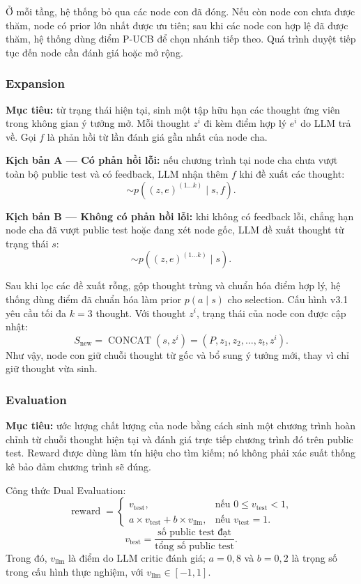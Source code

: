Ở mỗi tầng, hệ thống bỏ qua các node con đã đóng. Nếu còn node con chưa được thăm, node có prior lớn nhất được ưu tiên; sau khi các node con hợp lệ đã được thăm, hệ thống dùng điểm P-UCB để chọn nhánh tiếp theo. Quá trình duyệt tiếp tục đến node cần đánh giá hoặc mở rộng.

\subsubsection{Expansion}
\textbf{Mục tiêu:} từ trạng thái hiện tại, sinh một tập hữu hạn các thought ứng viên trong không gian ý tưởng mở. Mỗi thought $z^i$ đi kèm điểm hợp lý $e^i$ do LLM trả về. Gọi $f$ là phản hồi từ lần đánh giá gần nhất của node cha.

\textbf{Kịch bản A — Có phản hồi lỗi:} nếu chương trình tại node cha chưa vượt toàn bộ public test và có feedback, LLM nhận thêm $f$ khi đề xuất các thought:
\begin{equation}
  [(z^1,e^1),\ldots,(z^k,e^k)]
  \sim p\!\left((z,e)^{(1\ldots k)}\mid s,f\right).
  \tag{A}
\end{equation}

\textbf{Kịch bản B — Không có phản hồi lỗi:} khi không có feedback lỗi, chẳng hạn node cha đã vượt public test hoặc đang xét node gốc, LLM đề xuất thought từ trạng thái $s$:
\begin{equation}
  [(z^1,e^1),\ldots,(z^k,e^k)]
  \sim p\!\left((z,e)^{(1\ldots k)}\mid s\right).
  \tag{B}
\end{equation}

Sau khi lọc các đề xuất rỗng, gộp thought trùng và chuẩn hóa điểm hợp lý, hệ thống dùng điểm đã chuẩn hóa làm prior $p(a\mid s)$ cho selection. Cấu hình v3.1 yêu cầu tối đa $k=3$ thought. Với thought $z^i$, trạng thái của node con được cập nhật:
\[
  S_{\mathrm{new}}
  = \operatorname{CONCAT}(s,z^i)
  = (P,z_1,z_2,\ldots,z_t,z^i).
\]
Như vậy, node con giữ chuỗi thought từ gốc và bổ sung ý tưởng mới, thay vì chỉ giữ thought vừa sinh.

\subsubsection{Evaluation}
\textbf{Mục tiêu:} ước lượng chất lượng của node bằng cách sinh một chương trình hoàn chỉnh từ chuỗi thought hiện tại và đánh giá trực tiếp chương trình đó trên public test. Reward được dùng làm tín hiệu cho tìm kiếm; nó không phải xác suất thống kê bảo đảm chương trình sẽ đúng.

Công thức Dual Evaluation:
\[
  \operatorname{reward}=
  \begin{cases}
    v_{\mathrm{test}}, & \text{nếu } 0\le v_{\mathrm{test}}<1,\\
    a\times v_{\mathrm{test}}+b\times v_{\mathrm{llm}},
      & \text{nếu } v_{\mathrm{test}}=1.
  \end{cases}
\]
\[
  v_{\mathrm{test}}
  =\frac{\text{số public test đạt}}{\text{tổng số public test}}.
\]
Trong đó, $v_{\mathrm{llm}}$ là điểm do LLM critic đánh giá; $a=0{,}8$ và $b=0{,}2$ là trọng số trong cấu hình thực nghiệm, với $v_{\mathrm{llm}}\in[-1,1]$.


